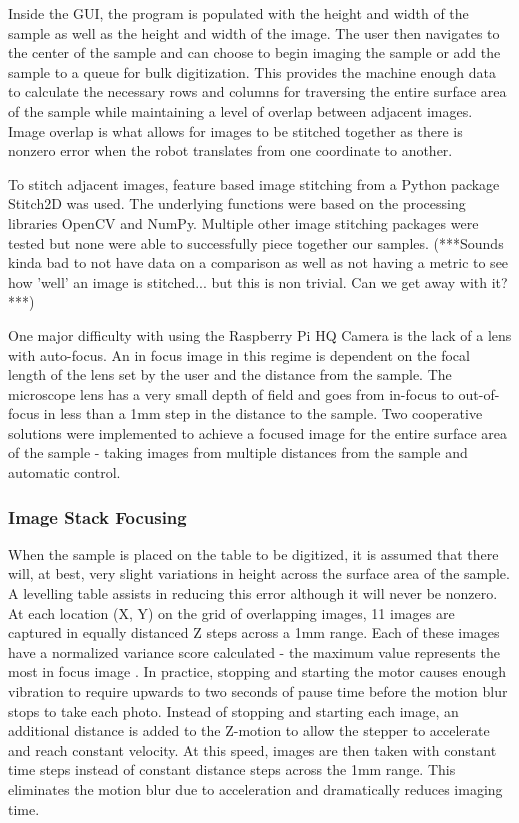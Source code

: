 \documentclass[a4paper,12pt]{article}
\begin{document}
Inside the GUI, the program is populated with the height and width of the sample as well as the height and width of the image. The user then navigates to the center of the sample and can choose 
to begin imaging the sample or add the sample to a queue for bulk digitization. This provides the machine enough data to calculate the necessary rows and columns for traversing the entire surface
area of the sample while maintaining a level of overlap between adjacent images. Image overlap is what allows for images to be stitched together as there is nonzero error when the robot translates 
from one coordinate to another. 

To stitch adjacent images, feature based image stitching from a Python package Stitch2D was used. The underlying functions were based on the processing libraries
OpenCV and NumPy. Multiple other image stitching packages were tested but none were able to successfully piece together our samples. (***Sounds kinda bad to not have data on a comparison as well as not having a metric to see how 'well' an image is stitched... but this is non trivial. Can we get away with it?***)

One major difficulty with using the Raspberry Pi HQ Camera is the lack of a lens with auto-focus. An in focus image in this regime is dependent on the focal length of the lens set by the user and the
distance from the sample. The microscope lens has a very small depth of field and goes from in-focus to out-of-focus in less than a 1mm step in the distance to the sample. Two cooperative solutions were implemented 
to achieve a focused image for the entire surface area of the sample - taking images from multiple distances from the sample and automatic control. 

\subsubsection{Image Stack Focusing}
When the sample is placed on the table to be digitized, it is assumed that there will, at best, very slight variations in height across the surface area of the sample. A levelling table 
assists in reducing this error although it will never be nonzero. At each location (X, Y) on the grid of overlapping images, 11 images are captured in equally distanced Z steps across a 1mm range. 
Each of these images have a normalized variance score calculated - the maximum value represents the most in focus image \citep{sampat_extensive_2014}. In practice, stopping and starting the motor causes 
enough vibration to require upwards to two seconds of pause time before the motion blur stops to take each photo. Instead of stopping and starting each image, an additional distance is added to the 
Z-motion to allow the stepper to accelerate and reach constant velocity. At this speed, images are then taken with constant time steps instead of constant distance steps across the 1mm range. This eliminates
the motion blur due to acceleration and dramatically reduces imaging time. 
\end{document}
